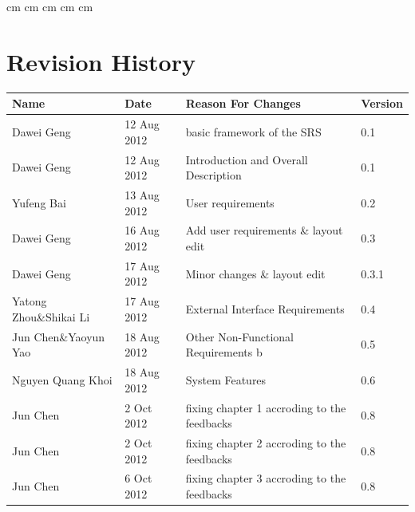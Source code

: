 \documentclass[11pt, a4paper]{report}
\begin{document}
 cm
 cm
 cm
 cm
 cm

\tableofcontents






\clearpage
\section*{Revision History}
\begin{tabular}{| l | l | l | l | }
\hline
Name      		&	Date        	&	Reason For Changes                  	&	Version     	\\ \hline
Dawei Geng      & 	12 Aug 2012    	& 	basic framework of the SRS     			&	0.1             \\ \hline
Dawei Geng      &	12 Aug 2012    	& 	Introduction and Overall Description    &	0.1             \\ \hline
Yufeng Bai  	&	13 Aug 2012 	&	User requirements 						&	0.2  			\\ \hline
Dawei Geng		&	16 Aug 2012		&	Add user requirements \& layout edit	&	0.3 			\\ \hline
Dawei Geng		&	17 Aug 2012		&	Minor changes \& layout edit			&	0.3.1 			\\ \hline
Yatong Zhou\&Shikai Li		&	17 Aug 2012		&		External Interface Requirements		&	0.4			\\ \hline
Jun Chen\&Yaoyun Yao		&	18 Aug 2012		&		Other Non-Functional Requirements	b&	0.5			\\ \hline
Nguyen Quang Khoi			&	18 Aug 2012		&		System Features			&	0.6				\\ \hline
Jun Chen	&	2 Oct 2012		&	fixing chapter 1 accroding to the feedbacks			&	0.8			\\ \hline
Jun Chen	&	2 Oct 2012		&	fixing chapter 2 accroding to the feedbacks			&	0.8 			\\ \hline
Jun Chen	&	6 Oct 2012		&	fixing chapter 3 accroding to the feedbacks			&	0.8 			\\ \hline






\end{tabular}
\clearpage

\end{document}
